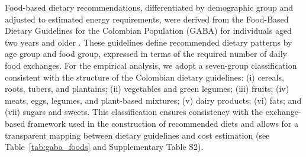 \documentclass[Afour, sageh,times]{sagej}
\begin{document}
Food-based dietary recommendations, differentiated by demographic group and adjusted to estimated energy requirements, were derived from the Food-Based Dietary Guidelines for the Colombian Population (GABA) for individuals aged two years and older \citep{GABA2021}. These guidelines define recommended dietary patterns by age group and food group, expressed in terms of the required number of daily food exchanges. For the empirical analysis, we adopt a seven-group classification consistent with the structure of the Colombian dietary guidelines: (i) cereals, roots, tubers, and plantains; (ii) vegetables and green legumes; (iii) fruits; (iv) meats, eggs, legumes, and plant-based mixtures; (v) dairy products; (vi) fats; and (vii) sugars and sweets. This classification ensures consistency with the exchange-based framework used in the construction of recommended diets and allows for a transparent mapping between dietary guidelines and cost estimation (see Table~\ref{tab:gaba_foods} and Supplementary Table S2).
\end{document}
